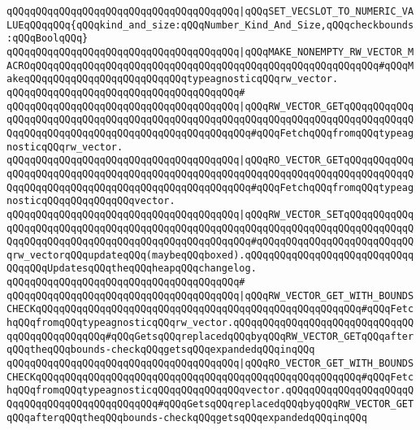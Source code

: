 \verb|qQQqqQQqqQQqqQQqqQQqqQQqqQQqqQQqqQQqqQQq|\verb#|qQQqSET_VECSLOT_TO_NUMERIC_VALUEqQQqqQQq{qQQqkind_and_size:qQQqNumber_Kind_And_Size,qQQqcheckbounds:qQQqBoolqQQq}#\newline
\newline
\verb|qQQqqQQqqQQqqQQqqQQqqQQqqQQqqQQqqQQqqQQq|\verb#|qQQqMAKE_NONEMPTY_RW_VECTOR_MACROqQQqqQQqqQQqqQQqqQQqqQQqqQQqqQQqqQQqqQQqqQQqqQQqqQQqqQQqqQQq#\verb|#qQQqMakeqQQqqQQqqQQqqQQqqQQqqQQqqQQqtypeagnosticqQQqrw_vector.|\newline
\verb|qQQqqQQqqQQqqQQqqQQqqQQqqQQqqQQqqQQqqQQq#|\newline
\verb|qQQqqQQqqQQqqQQqqQQqqQQqqQQqqQQqqQQqqQQq|\verb#|qQQqRW_VECTOR_GETqQQqqQQqqQQqqQQqqQQqqQQqqQQqqQQqqQQqqQQqqQQqqQQqqQQqqQQqqQQqqQQqqQQqqQQqqQQqqQQqqQQqqQQqqQQqqQQqqQQqqQQqqQQqqQQqqQQqqQQqqQQq#\verb|#qQQqFetchqQQqfromqQQqtypeagnosticqQQqrw_vector.|\newline
\verb|qQQqqQQqqQQqqQQqqQQqqQQqqQQqqQQqqQQqqQQq|\verb#|qQQqRO_VECTOR_GETqQQqqQQqqQQqqQQqqQQqqQQqqQQqqQQqqQQqqQQqqQQqqQQqqQQqqQQqqQQqqQQqqQQqqQQqqQQqqQQqqQQqqQQqqQQqqQQqqQQqqQQqqQQqqQQqqQQqqQQqqQQq#\verb|#qQQqFetchqQQqfromqQQqtypeagnosticqQQqqQQqqQQqqQQqvector.|\newline
\verb|qQQqqQQqqQQqqQQqqQQqqQQqqQQqqQQqqQQqqQQq|\verb#|qQQqRW_VECTOR_SETqQQqqQQqqQQqqQQqqQQqqQQqqQQqqQQqqQQqqQQqqQQqqQQqqQQqqQQqqQQqqQQqqQQqqQQqqQQqqQQqqQQqqQQqqQQqqQQqqQQqqQQqqQQqqQQqqQQqqQQqqQQq#\verb|#qQQqqQQqqQQqqQQqqQQqqQQqqQQqrw_vectorqQQqupdateqQQq(maybeqQQqboxed).qQQqqQQqqQQqqQQqqQQqqQQqqQQqqQQqqQQqUpdatesqQQqtheqQQqheapqQQqchangelog.|\newline
\verb|qQQqqQQqqQQqqQQqqQQqqQQqqQQqqQQqqQQqqQQq#|\newline
\verb|qQQqqQQqqQQqqQQqqQQqqQQqqQQqqQQqqQQqqQQq|\verb#|qQQqRW_VECTOR_GET_WITH_BOUNDSCHECKqQQqqQQqqQQqqQQqqQQqqQQqqQQqqQQqqQQqqQQqqQQqqQQqqQQqqQQq#\verb|#qQQqFetchqQQqfromqQQqtypeagnosticqQQqrw_vector.qQQqqQQqqQQqqQQqqQQqqQQqqQQqqQQqqQQqqQQqqQQqqQQq#qQQqGetsqQQqreplacedqQQqbyqQQqRW_VECTOR_GETqQQqafterqQQqtheqQQqbounds-checkqQQqgetsqQQqexpandedqQQqinqQQq|\newline
\verb|qQQqqQQqqQQqqQQqqQQqqQQqqQQqqQQqqQQqqQQq|\verb#|qQQqRO_VECTOR_GET_WITH_BOUNDSCHECKqQQqqQQqqQQqqQQqqQQqqQQqqQQqqQQqqQQqqQQqqQQqqQQqqQQqqQQq#\verb|#qQQqFetchqQQqfromqQQqtypeagnosticqQQqqQQqqQQqqQQqvector.qQQqqQQqqQQqqQQqqQQqqQQqqQQqqQQqqQQqqQQqqQQqqQQq#qQQqGetsqQQqreplacedqQQqbyqQQqRW_VECTOR_GETqQQqafterqQQqtheqQQqbounds-checkqQQqgetsqQQqexpandedqQQqinqQQq|\newline
